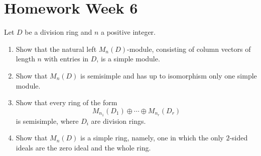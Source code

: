 \section{Homework Week 6}

\begin{exercise}
    Let $D$ be a division ring and $n$ a positive integer.
    \begin{enumerate}
        \renewcommand{\labelenumi}{(\alph{enumi})}
        \item Show that the natural left $M_n(D)$-module, consisting of column vectors of length $n$ with entries in $D$, is a simple module.
        \item Show that $M_n(D)$ is semisimple and has up to isomorphism only one simple module.
        \item Show that every ring of the form
              \[
                  M_{n_1}(D_1)\oplus \cdots \oplus M_{n_r}(D_r)
              \]
              is semisimple, where $D_i$ are division rings.
        \item Show that $M_n(D)$ is a simple ring, namely, one in which the only $2$-sided ideals are the zero ideal and the whole ring.
    \end{enumerate}
\end{exercise}

